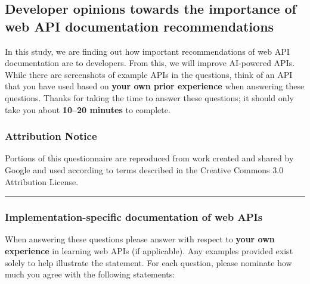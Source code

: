 \subsection*{Developer opinions towards the importance of web API documentation recommendations}\noindent
In this study, we are finding out how important recommendations of web API documentation are to developers. From this, we will improve AI-powered APIs. While there are screenshots of example APIs in the questions, think of an API that you have used based on \textbf{your own prior experience} when answering these questions.   Thanks for taking the time to answer these questions; it should only take you about \textbf{10--20 minutes} to complete. 

\subsubsection*{Attribution Notice}\noindent
Portions of this questionnaire are reproduced from work created and shared by Google and used according to terms described in the Creative Commons 3.0 Attribution License. 

\bigskip\hrule

\subsubsection*{Implementation-specific documentation of web APIs}\noindent
When answering these questions please answer with respect to \textbf{your own experience} in learning web APIs (if applicable). Any examples provided exist solely to help illustrate the statement. For each question, please nominate how much you agree with the following statements: \AgreementScale


